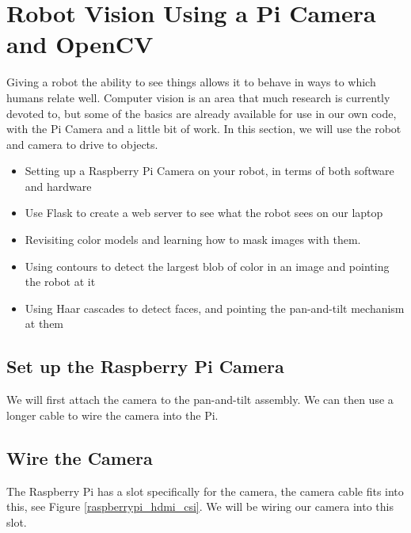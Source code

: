 \section{Robot Vision Using a Pi Camera and OpenCV}
\label{robot_vision_using_pi_camera_opencv}

Giving a robot the ability to see things allows it to behave in ways to which humans relate
well. Computer vision is an area that much research is currently devoted to, but some of the
basics are already available for use in our own code, with the Pi Camera and a little bit of
work. In this section, we will use the robot and camera to drive to objects.

\begin{itemize}
\item Setting up a Raspberry Pi Camera on your robot, in terms of both software and hardware
\item Use Flask to create a web server to see what the robot sees on our laptop
\item Revisiting color models and learning how to mask images with them.
\item Using contours to detect the largest blob of color in an image and pointing the robot at it
\item Using Haar cascades to detect faces, and pointing the pan-and-tilt mechanism at them
\end{itemize}

\subsection{Set up the Raspberry Pi Camera}
We will first attach the camera to the pan-and-tilt assembly. We can then use a longer cable
to wire the camera into the Pi.

\subsection{Wire the Camera}
\label{wire_the_camera}

The Raspberry Pi has a slot specifically for the camera, 
the camera cable fits into this, see Figure \ref{raspberrypi_hdmi_csi}. We will be wiring our camera into this slot.

